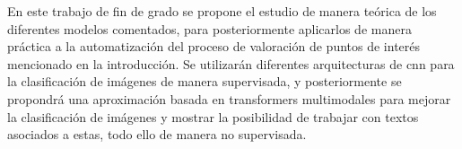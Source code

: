 	En este trabajo de fin de grado se propone el estudio de manera teórica de los diferentes modelos comentados, para posteriormente aplicarlos de manera práctica a la automatización del proceso de valoración de puntos de interés mencionado en la introducción. Se utilizarán diferentes arquitecturas de \gls{cnn} para la clasificación de imágenes de manera supervisada, y posteriormente se propondrá una aproximación basada en transformers multimodales para mejorar la clasificación de imágenes y mostrar la posibilidad de trabajar con textos asociados a estas, todo ello de manera no supervisada. 